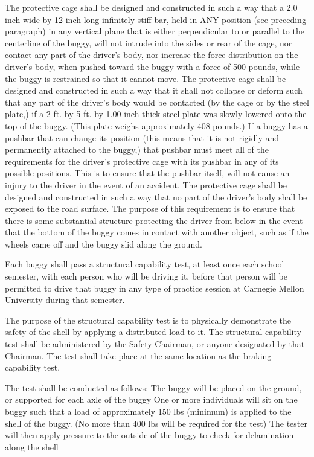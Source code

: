 	The protective cage shall be designed and constructed in such a way that a 2.0 inch wide by 12 inch long infinitely stiff bar, held in ANY position (see preceding paragraph) in any vertical plane that is either perpendicular to or parallel to the centerline of the buggy, will not intrude into the sides or rear of the cage, nor contact any part of the driver's body, nor increase the force distribution on the driver's body, when pushed toward the buggy with a force of 500 pounds, while the buggy is restrained so that it cannot move.
	The protective cage shall be designed and constructed in such a way that it shall not collapse or deform such that any part of the driver's body would be contacted (by the cage or by the steel plate,) if a 2 ft. by 5 ft. by 1.00 inch thick steel plate was slowly lowered onto the top of the buggy. (This plate weighs approximately 408 pounds.)
	If a buggy has a pushbar that can change its position (this means that it is not rigidly and permanently attached to the buggy,) that pushbar must meet all of the requirements for the driver's protective cage with its pushbar in any of its possible positions. This is to ensure that the pushbar itself, will not cause an injury to the driver in the event of an accident.
	The protective cage shall be designed and constructed in such a way that no part of the driver's body shall be exposed to the road surface. The purpose of this requirement is to ensure that there is some substantial structure protecting the driver from below in the event that the bottom of the buggy comes in contact with another object, such as if the wheels came off and the buggy slid along the ground.

	Each buggy shall pass a structural capability test, at least once each school semester, with each person who will be driving it, before that person will be permitted to drive that buggy in any type of practice session at Carnegie Mellon University during that semester. 

	The purpose of the structural capability test is to physically demonstrate the safety of the shell by applying a distributed load to it. The structural capability test shall be administered by the Safety Chairman, or anyone designated by that Chairman. The test shall take place at the same location as the braking capability test. 

	The test shall be conducted as follows: 
	The buggy will be placed on the ground, or supported for each axle of the buggy 
	One or more individuals will sit on the buggy such that a load of approximately 150 lbs (minimum) is applied to the shell of the buggy. (No more than 400 lbs will be required for the test)
	The tester will then apply pressure to the outside of the buggy to check for delamination along the shell

